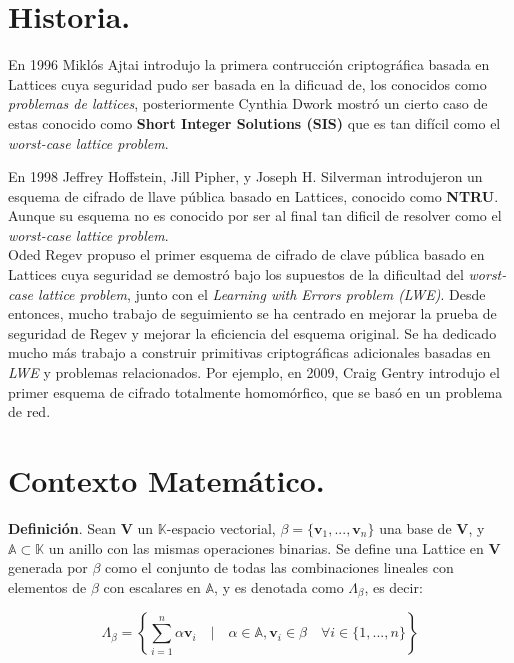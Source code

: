 \documentclass[11pt]{article}
\begin{document}
\begin{abstact}
\section{Historia.}

En 1996  Miklós Ajtai introdujo la primera contrucción criptográfica basada en Lattices cuya seguridad pudo ser basada en la dificuad de, los conocidos como \textit{problemas de lattices}, posteriormente Cynthia Dwork mostró un cierto caso de estas conocido como \textbf{Short Integer Solutions (SIS)} que es tan difícil como el \textit{worst-case lattice problem}.

En 1998 Jeffrey Hoffstein, Jill Pipher, y Joseph H. Silverman introdujeron un esquema de cifrado de llave pública basado en Lattices, conocido como \textbf{NTRU}. Aunque su esquema no es conocido por ser al final tan dificil de resolver como el \textit{worst-case lattice problem}. \\

Oded Regev propuso el primer esquema de cifrado de clave pública basado en Lattices cuya seguridad se demostró bajo los supuestos de la dificultad del \textit{worst-case lattice problem}, junto con el \textit{Learning with Errors problem (LWE)}. Desde entonces, mucho trabajo de seguimiento se ha centrado en mejorar la prueba de seguridad de Regev  y mejorar la eficiencia del esquema original. Se ha dedicado mucho más trabajo a construir primitivas criptográficas adicionales basadas en \textit{LWE} y problemas relacionados. Por ejemplo, en 2009, Craig Gentry introdujo el primer esquema de cifrado totalmente homomórfico, que se basó en un problema de red. \\ 


\section{Contexto Matemático.}

\textbf{Definición}. Sean \textbf{V} un $\mathbb{K}$-espacio vectorial, $\beta = \{ \mathbf{{v}}_{1},..., \mathbf{{v}}_{n}\}$ una base de \textbf{V}, y $\mathbb{A} \subset \mathbb{K}$ un anillo con las mismas operaciones binarias. Se define una Lattice en \textbf{V} generada por $\beta$ como el conjunto de todas las combinaciones lineales con elementos de $\beta$ con escalares en $\mathbb{A}$, y es denotada como $\Lambda_{\beta}$, es decir:

\[ \Lambda_{\beta} = \left\{ \sum _{{i=1}}^{{n}}\alpha{\mathbf  {v}}_{i}\quad |\quad \alpha \in \mathbb{A},{\mathbf  {v}}_{i}\in \beta \quad \forall i \in \{1,..., n\} \right\} \]


\end{abstact}
\end{document}
